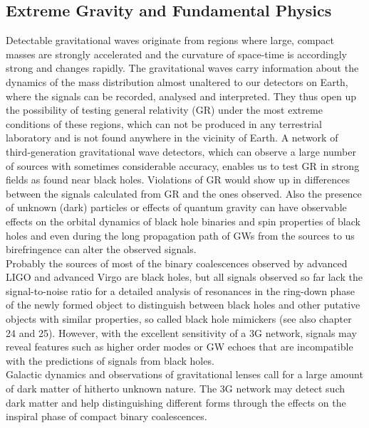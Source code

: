 \documentclass[graybox, nosecnum]{svmult}
\begin{document}
\subsection{Extreme Gravity and Fundamental Physics}
Detectable gravitational waves originate from regions where large, compact masses are strongly accelerated and the curvature of space-time is accordingly strong and changes rapidly. The gravitational waves carry information about the dynamics of the mass distribution almost unaltered to our detectors on Earth, where the signals can be recorded, analysed and interpreted. They thus open up the possibility of testing general relativity (GR) under the most extreme conditions of these regions, which can not be produced in any terrestrial laboratory and is not found anywhere in the vicinity of Earth. A network of third-generation gravitational wave detectors, which can observe a large number of sources with sometimes considerable accuracy, enables us to test GR in strong fields as found near black holes. Violations of GR would show up in differences between the signals calculated from GR and the ones observed. Also the presence of unknown (dark) particles or effects of quantum gravity can have observable effects on the orbital dynamics of black hole binaries and spin properties of black holes and even during the long propagation path of GWs from the sources to us birefringence can alter the observed signals.\\
Probably the sources of most of the binary coalescences observed by advanced LIGO and advanced Virgo are black holes, but all signals observed so far lack the signal-to-noise ratio for a detailed analysis of resonances in the ring-down phase of the newly formed object to distinguish between black holes and other putative objects with similar properties, so called black hole mimickers {\color{green} (see also chapter 24 and 25)}. However, with the excellent sensitivity of a 3G network, signals may reveal features such as higher order modes or GW echoes that are incompatible with the predictions of signals from black holes. \\
Galactic dynamics and observations of gravitational lenses call for a large amount of dark matter of hitherto unknown nature. The 3G network may detect such dark matter and help distinguishing different forms through the effects on the inspiral phase of compact binary coalescences. 
\end{document}
